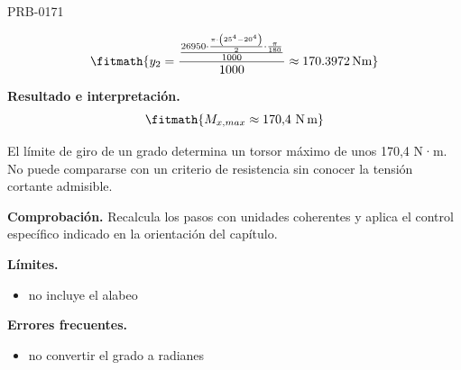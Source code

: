 \begin{studiumworked}{PRB-0171}
\begin{enumerate}
\[\fitmath{y_{2}=\frac{\frac{26950\cdot \frac{\pi\cdot \left({25}^{4}-{20}^{4}\right)}{2}\cdot \frac{\pi}{180}}{1000}}{1000}\approx 170.3972\,\mathrm{N m}}\]

\end{enumerate}

\textbf{Resultado e interpretación.}\[\fitmath{M_{x,max} \approx 170{,}4\ \mathrm{N\,m}}\]

El límite de giro de un grado determina un torsor máximo de unos 170,4 N·m. No puede compararse con un criterio de resistencia sin conocer la tensión cortante admisible.

\par\textbf{Comprobación.} Recalcula los pasos con unidades coherentes y aplica el control específico indicado en la orientación del capítulo.

\textbf{Límites.}\begin{itemize}\item no incluye el alabeo\end{itemize}

\textbf{Errores frecuentes.}\begin{itemize}\item no convertir el grado a radianes\end{itemize}

\end{studiumworked}

\Needspace{.3\textheight}

